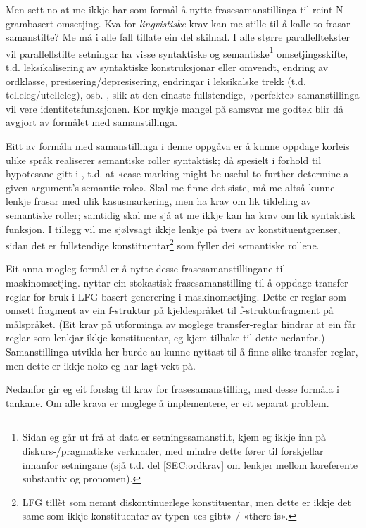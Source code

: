 \documentclass[11pt,a4paper,oneside,draft]{book}
\begin{document}
Men sett no at me ikkje har som formål å nytte frasesamanstillinga til
reint N-grambasert omsetjing. Kva for \emph{lingvistiske} krav kan me
stille til å kalle to frasar samanstilte? Me må i alle fall tillate
ein del skilnad.  I alle større parallelltekster vil parallellstilte
setningar ha visse syntaktiske og semantiske\footnote{Sidan eg går ut frå at data er setningssamanstilt, kjem eg
       ikkje inn på diskurs-/pragmatiske verknader, med mindre dette
       fører til forskjellar innanfor setningane (sjå t.d. del
       \ref{SEC:ordkrav} om lenkjer mellom koreferente substantiv og
       pronomen). } omsetjingsskifte,
t.d. leksikalisering av syntaktiske konstruksjonar eller omvendt,
endring av ordklasse, presisering/depresisering, endringar i leksikalske
trekk (t.d. telleleg/utelleleg),
osb. \citep[s.~56--62]{munday2001its}, slik at den einaste
fullstendige, «perfekte» samanstillinga vil vere
identitetsfunksjonen. Kor mykje mangel på samsvar me godtek blir då
avgjort av formålet med samanstillinga.

Eitt av formåla med samanstillinga i denne oppgåva er å kunne oppdage
korleis ulike språk realiserer semantiske roller syntaktisk; då
spesielt i forhold til hypotesane gitt i \citet[s.~7]{xpar2008rcn},
t.d. at «case marking might be useful to further determine a given
argument's semantic role». Skal me finne det siste, må me altså kunne
lenkje frasar med ulik kasusmarkering, men ha krav om lik tildeling av
semantiske roller; samtidig skal me sjå at me ikkje kan ha krav om lik
syntaktisk funksjon. I tillegg vil me sjølvsagt ikkje lenkje på tvers
av konstituentgrenser, sidan det er fullstendige konstituentar\footnote{LFG tillèt som nemnt diskontinuerlege konstituentar, men dette
        er ikkje det same som ikkje-konstituentar av typen «es gibt» /
        «there is». }
som fyller dei semantiske rollene.

Eit anna mogleg formål er å nytte desse frasesamanstillingane til
maskinomsetjing. \citet{riezler2006gmt} nyttar ein stokastisk
frasesamanstilling til å oppdage transfer-reglar for bruk i LFG-basert
generering i maskinomsetjing. Dette er reglar som omsett fragment av
ein f-struktur på kjeldespråket til f-strukturfragment på
målspråket. (Eit krav på utforminga av moglege transfer-reglar hindrar
at ein får reglar som lenkjar ikkje-konstituentar, eg kjem tilbake til
dette nedanfor.)  Samanstillinga utvikla her burde au kunne nyttast
til å finne slike transfer-reglar, men dette er ikkje noko eg har lagt
vekt på.

Nedanfor gir eg eit forslag til krav for frasesamanstilling, med desse
formåla i tankane. Om alle krava er moglege å implementere, er eit
separat problem.
\end{document}

